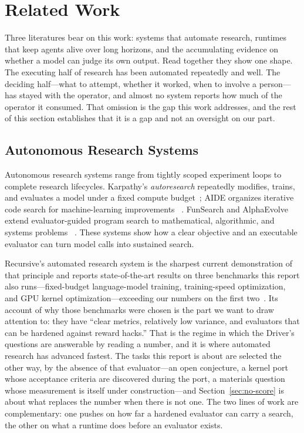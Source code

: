 \section{Related Work}
\label{sec:related}

Three literatures bear on this work: systems that automate research, runtimes that
keep agents alive over long horizons, and the accumulating evidence on whether a
model can judge its own output. Read together they show one shape. The executing half
of research has been automated repeatedly and well. The deciding half---what to
attempt, whether it worked, when to involve a person---has stayed with the operator,
and almost no system reports how much of the operator it consumed. That omission is
the gap this work addresses, and the rest of this section establishes that it is a
gap and not an oversight on our part.

\subsection{Autonomous Research Systems}

Autonomous research systems range from tightly scoped experiment loops to complete
research lifecycles. Karpathy's \emph{autoresearch} repeatedly modifies, trains, and
evaluates a model under a fixed compute budget~\citep{karpathy_autoresearch}; AIDE
organizes iterative code search for machine-learning improvements
~\citep{jiang2025aide}. FunSearch and AlphaEvolve extend evaluator-guided program
search to mathematical, algorithmic, and systems problems
~\citep{romera2024funsearch,novikov2025alphaevolve}. These systems show how a clear
objective and an executable evaluator can turn model calls into sustained search.

Recursive's automated research system is the sharpest current demonstration of that
principle and reports state-of-the-art results on three benchmarks this report also
runs---fixed-budget language-model training, training-speed optimization, and GPU
kernel optimization---exceeding our numbers on the first
two~\citep{recursive2026firststeps}. Its account of why those benchmarks were chosen
is the part we want to draw attention to: they have ``clear metrics, relatively low
variance, and evaluators that can be hardened against reward hacks.'' That is the
regime in which the Driver's questions are answerable by reading a number, and it is
where automated research has advanced fastest. The tasks this report is about are
selected the other way, by the absence of that evaluator---an open conjecture, a
kernel port whose acceptance criteria are discovered during the port, a materials
question whose measurement is itself under construction---and Section~\ref{sec:no-score}
is about what replaces the number when there is not one. The two lines of work are
complementary: one pushes on how far a hardened evaluator can carry a search, the
other on what a runtime does before an evaluator exists.

